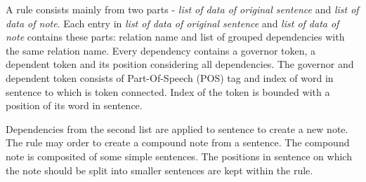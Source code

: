 \documentclass{iitsrc}
\begin{document}
	
	
	
		A rule consists mainly from two parts - \textit{list of data of original sentence} and \textit{list of data of note}. Each entry in \textit{list of data of original sentence} and \textit{list of data of note} contains these parts: relation name and list of grouped dependencies with the same relation name. Every dependency contains a governor token, a dependent token and its position considering all dependencies. The governor and dependent token consists of Part-Of-Speech (POS) tag and index of word in sentence to which is token connected. Index of the token is bounded with a position of its word in sentence.
		
		Dependencies from the second list are applied to sentence to create a new note. The rule may order to create a compound note from a sentence. The compound note is composited of some simple sentences. The positions in sentence on which the note should be split into smaller sentences are kept within the rule. \\
		
\end{document}
